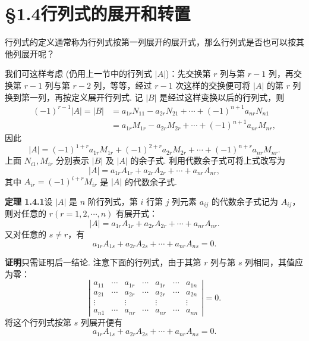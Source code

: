 \documentclass[UTF8,12pt,a4paper,fontset=fandol]{ctexart}
\begin{document}
\section*{§1.4\quad 行列式的展开和转置}

行列式的定义通常称为行列式按第一列展开的展开式，那么行列式是否也可以按其他列展开呢？

我们可这样考虑 (仍用上一节中的行列式 $|A|$)：先交换第 $r$ 列与第 $r-1$ 列，再交换第 $r-1$ 列与第 $r-2$ 列，等等，经过 $r-1$ 次这样的交换便可将 $|A|$ 的第 $r$ 列换到第一列，再按定义展开行列式. 记 $|B|$ 是经过这样变换以后的行列式，则
\[
\begin{aligned}
(-1)^{r-1}|A|=|B|
&=a_{1r}N_{11}-a_{2r}N_{21}+\cdots+(-1)^{n+1}a_{nr}N_{n1}\\
&=a_{1r}M_{1r}-a_{2r}M_{2r}+\cdots+(-1)^{n+1}a_{nr}M_{nr},
\end{aligned}
\]
因此
\begin{equation}
|A|=(-1)^{1+r}a_{1r}M_{1r}+(-1)^{2+r}a_{2r}M_{2r}+\cdots+(-1)^{n+r}a_{nr}M_{nr}.
\tag{1.4.1}
\end{equation}
上面 $N_{i1},M_{ir}$ 分别表示 $|B|$ 及 $|A|$ 的余子式. 利用代数余子式可将上式改写为
\begin{equation}
|A|=a_{1r}A_{1r}+a_{2r}A_{2r}+\cdots+a_{nr}A_{nr},
\tag{1.4.2}
\end{equation}
其中 $A_{ir}=(-1)^{i+r}M_{ir}$ 是 $|A|$ 的代数余子式.

\noindent\textbf{定理 1.4.1}\quad 设 $|A|$ 是 $n$ 阶行列式，第 $i$ 行第 $j$ 列元素 $a_{ij}$ 的代数余子式记为 $A_{ij}$，则对任意的 $r(r=1,2,\cdots,n)$ 有展开式：
\begin{equation}
|A|=a_{1r}A_{1r}+a_{2r}A_{2r}+\cdots+a_{nr}A_{nr}.
\tag{1.4.3}
\end{equation}
又对任意的 $s\ne r$，有
\begin{equation}
a_{1r}A_{1s}+a_{2r}A_{2s}+\cdots+a_{nr}A_{ns}=0.
\tag{1.4.4}
\end{equation}

\noindent\textbf{证明}\quad 只需证明后一结论. 注意下面的行列式，由于其第 $r$ 列与第 $s$ 列相同，其值应为零：
\[
\left|\begin{array}{ccccccc}
a_{11} & \cdots & a_{1r} & \cdots & a_{1r} & \cdots & a_{1n}\\
a_{21} & \cdots & a_{2r} & \cdots & a_{2r} & \cdots & a_{2n}\\
\vdots & & \vdots & & \vdots & & \vdots\\
a_{n1} & \cdots & a_{nr} & \cdots & a_{nr} & \cdots & a_{nn}
\end{array}\right|=0.
\]
将这个行列式按第 $s$ 列展开便有
\[
a_{1r}A_{1s}+a_{2r}A_{2s}+\cdots+a_{nr}A_{ns}=0.
\]
\end{document}
